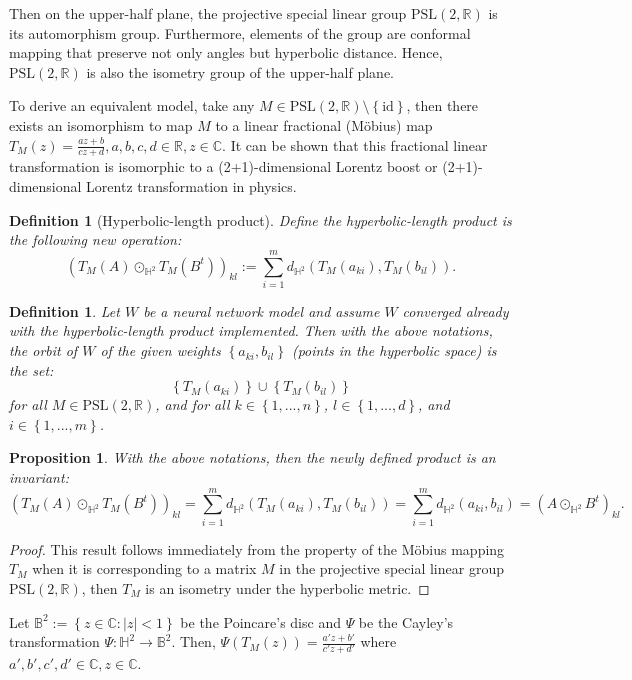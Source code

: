 \documentclass{article}
\theoremstyle{plain}
\theoremstyle{plain} %
\newtheorem{proposition}{Proposition}
\newtheorem{definition}[theorem]{Definition}
\theoremstyle{definition}  %
\theoremstyle{remark}  %
\theoremstyle{plain}
\begin{document}
Then on the upper-half plane, the projective special linear group $\text{PSL}(2,\mathbb{R})$ is its automorphism group. Furthermore, elements of the group are conformal mapping that preserve not only angles but hyperbolic distance. Hence, $\text{PSL}(2,\mathbb{R})$ is also the isometry group of the upper-half plane.


To derive an equivalent model, take any $M\in \text{PSL}(2,\mathbb{R})\setminus\left\lbrace \text{id}\right\rbrace$, then there exists an isomorphism to map $M$ to a linear fractional (M\"{o}bius) map $T_M(z)=\frac{az+b}{cz+d}, a,b,c,d\in\mathbb{R},z\in\mathbb{C}$. It can be shown that this fractional linear transformation is isomorphic to a (2+1)-dimensional Lorentz boost or (2+1)-dimensional Lorentz transformation in physics.
\begin{definition}[Hyperbolic-length product]
Define \textit{the hyperbolic-length product} is the following new operation:
$$
\left( T_M(A) \odot_{\mathbb{H}^2} T_M(B^t)\right)_{kl} := \sum\limits_{i=1}^m d_{\mathbb{H}^2} \left(T_M \left( a_{ki} \right) ,T_M\left( b_{il}\right) \right).
$$
\end{definition}
\begin{definition}
Let $W$ be a neural network model and assume $W$ converged already with the hyperbolic-length product implemented. Then with the above notations, the orbit of $W$ of the given weights $\left\lbrace a_{ki},  b_{il}\right\rbrace$ (points in the hyperbolic space) is the set:
$$
\left\lbrace T_M(a_{ki}) \right\rbrace \cup \left\lbrace T_M(b_{il}) \right\rbrace
$$
for all $M\in \text{PSL}(2,\mathbb{R})$, and for all $k\in\left\lbrace 1,...,n\right\rbrace$, $l\in\left\lbrace 1,...,d\right\rbrace$, and $i\in\left\lbrace 1,...,m\right\rbrace$.
\end{definition}
\begin{proposition}
With the above notations, then the newly defined product is an invariant:
$$
\left( T_M(A) \odot_{\mathbb{H}^2} T_M(B^t)\right)_{kl} = \sum\limits_{i=1}^m d_{\mathbb{H}^2} \left(T_M \left( a_{ki} \right) ,T_M\left( b_{il}\right) \right)
=  \sum\limits_{i=1}^m d_{\mathbb{H}^2} \left( a_{ki}  , b_{il} \right)  =\left( A\odot_{\mathbb{H}^2} B^t\right)_{kl}.$$
\end{proposition}
\begin{proof}
This result follows immediately from the property of the M\"{o}bius mapping $T_M$ when it is corresponding to a matrix $M$ in the projective special linear group $\text{PSL}(2,\mathbb{R})$, then $T_M$ is an isometry under the hyperbolic metric.
\end{proof}
Let $\mathbb{B}^2:=\left\lbrace z\in\mathbb{C} : \vert z \vert <1\right\rbrace$ be the Poincare's disc and $\Psi$ be the Cayley's transformation $\Psi: \mathbb{H}^2 \to \mathbb{B}^2$. Then, $\Psi\left( T_M(z)\right)=\frac{a'z+b'}{c'z+d'}$ where $a',b',c',d'\in\mathbb{C},z\in\mathbb{C}$.
\end{document}
